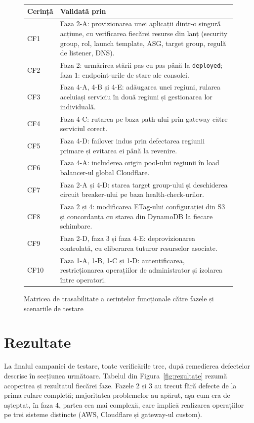 \documentclass[12pt,a4paper]{report}
\begin{document}
\begin{figure}[t]
\centering
\small\linespread{1.05}\selectfont
\begin{tabular}{@{}p{1.7cm}p{12.6cm}@{}}
\toprule
\textbf{Cerință} & \textbf{Validată prin} \\
\midrule
CF1 & Faza 2-A: provizionarea unei aplicații dintr-o singură acțiune, cu verificarea fiecărei resurse din lanț (security group, rol, launch template, ASG, target group, regulă de listener, DNS). \\
CF2 & Faza 2: urmărirea stării pas cu pas până la \texttt{deployed}; faza 1: endpoint-urile de stare ale consolei. \\
CF3 & Faza 4-A, 4-B și 4-E: adăugarea unei regiuni, rularea aceluiași serviciu în două regiuni și gestionarea lor individuală. \\
CF4 & Faza 4-C: rutarea pe baza path-ului prin gateway către serviciul corect. \\
CF5 & Faza 4-D: failover indus prin defectarea regiunii primare și evitarea ei până la revenire. \\
CF6 & Faza 4-A: includerea origin pool-ului regiunii în load balancer-ul global Cloudflare. \\
CF7 & Faza 2-A și 4-D: starea target group-ului și deschiderea circuit breaker-ului pe baza health-check-urilor. \\
CF8 & Faza 2 și 4: modificarea ETag-ului configurației din S3 și concordanța cu starea din DynamoDB la fiecare schimbare. \\
CF9 & Faza 2-D, faza 3 și faza 4-E: deprovizionarea controlată, cu eliberarea tuturor resurselor asociate. \\
CF10 & Faza 1-A, 1-B, 1-C și 1-D: autentificarea, restricționarea operațiilor de administrator și izolarea între operatori. \\
\bottomrule
\end{tabular}
\caption{Matricea de trasabilitate a cerințelor funcționale către fazele și scenariile de testare}
\label{fig:trasab}
\end{figure}

\section{Rezultate}
La finalul campaniei de testare, toate verificările trec, după remedierea defectelor descrise în secțiunea următoare. Tabelul din Figura~\ref{fig:rezultate} rezumă acoperirea și rezultatul fiecărei faze. Fazele 2 și 3 au trecut fără defecte de la prima rulare completă; majoritatea problemelor au apărut, așa cum era de așteptat, în faza 4, partea cea mai complexă, care implică realizarea operațiilor pe trei sisteme distincte (AWS, Cloudflare și gateway-ul custom).
\end{document}
